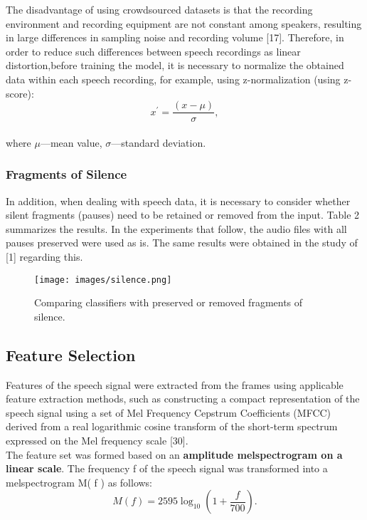 \documentclass[ams]{U-AizuGT}
\begin{document}
The disadvantage of using crowdsourced datasets is that the recording environment and recording equipment are not constant among speakers, resulting in large differences in sampling noise and recording volume [17]. Therefore, in order to reduce such differences between speech recordings as linear distortion,before training the model, it is necessary to normalize the obtained data within each speech recording, for example, using z-normalization (using z-score):
\\
\begin{equation}
x^{\prime}=\frac{(x-\mu)}{\sigma},
\end{equation}
\\
where $\mu$---mean value, $\sigma$---standard deviation.
\subsubsection{Fragments of Silence}
In addition, when dealing with speech data, it is necessary to consider whether silent fragments (pauses) need to be retained or removed from the input. Table 2 summarizes the results. In the experiments that follow, the audio files with all pauses preserved were used as is. The same results were obtained in the study of [1] regarding this.

\begin{figure}[h]
    \centering
    \texttt{[image: images/silence.png]}
    \caption{Comparing classifiers with preserved or removed fragments of silence.}
\end{figure}
\subsection{Feature Selection}
Features of the speech signal were extracted from the frames using applicable feature extraction methods, such as constructing a compact representation of the speech signal using a set of Mel Frequency Cepstrum Coefficients (MFCC) derived from a real logarithmic cosine transform of the short-term spectrum expressed on the Mel frequency scale [30].\\
The feature set was formed based on an \textbf{amplitude melspectrogram on a linear scale}. The frequency f of the speech signal was transformed into a melspectrogram M( f ) as follows:
\\
\begin{equation}
M(f)=2595\log_{10}(1+\frac{f}{700}).
\end{equation}
\\
\end{document}

